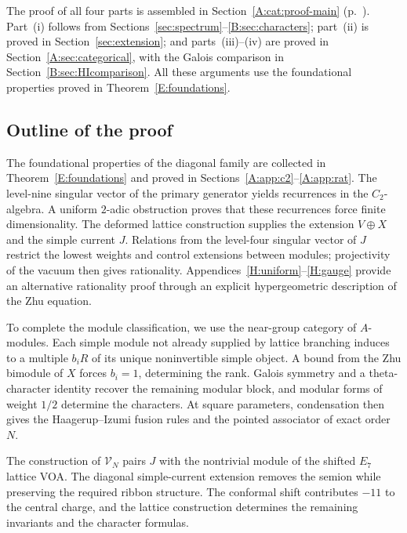 \documentclass[11pt]{article}
\numberwithin{equation}{section}
\begin{document}
The proof of all four parts is assembled in Section~\ref{A:cat:proof-main} (p.~\pageref{A:cat:proof-main}). Part~\textup{(i)} follows from Sections~\ref{sec:spectrum}--\ref{B:sec:characters}; part~\textup{(ii)} is proved in Section~\ref{sec:extension}; and parts~\textup{(iii)}--\textup{(iv)} are proved in Section~\ref{A:sec:categorical}, with the Galois comparison in Section~\ref{B:sec:HIcomparison}. All these arguments use the foundational properties proved in Theorem~\ref{E:foundations}.

\subsection*{Outline of the proof}
The foundational properties of the diagonal family are collected in Theorem~\ref{E:foundations} and proved in Sections~\ref{A:app:c2}--\ref{A:app:rat}. The level-nine singular vector of the primary generator yields recurrences in the $C_2$-algebra. A uniform $2$-adic obstruction proves that these recurrences force finite dimensionality. The deformed lattice construction supplies the extension $V\oplus X$ and the simple current $J$. Relations from the level-four singular vector of $J$ restrict the lowest weights and control extensions between modules; projectivity of the vacuum then gives rationality. Appendices~\ref{H:uniform}--\ref{H:gauge} provide an alternative rationality proof through an explicit hypergeometric description of the Zhu equation.

To complete the module classification, we use the near-group category of $A$-modules. Each simple module not already supplied by lattice branching induces to a multiple $b_iR$ of its unique noninvertible simple object. A bound from the Zhu bimodule of $X$ forces $b_i=1$, determining the rank. Galois symmetry and a theta-character identity recover the remaining modular block, and modular forms of weight $1/2$ determine the characters. At square parameters, condensation then gives the Haagerup--Izumi fusion rules and the pointed associator of exact order $N$.

The construction of $\mathscr{V}_N$ pairs $J$ with the nontrivial module of the shifted $E_7$ lattice VOA. The diagonal simple-current extension removes the semion while preserving the required ribbon structure. The conformal shift contributes $-11$ to the central charge, and the lattice construction determines the remaining invariants and the character formulas.
\end{document}
